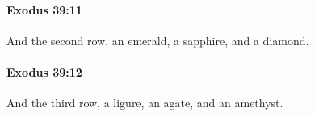 		\paragraph{Exodus 39:11} %
			\label{EXODUS-39-11}

			And the second row, an emerald, a sapphire, and a diamond.


		\paragraph{Exodus 39:12} %
			\label{EXODUS-39-12}

			And the third row, a ligure, an agate, and an amethyst.



